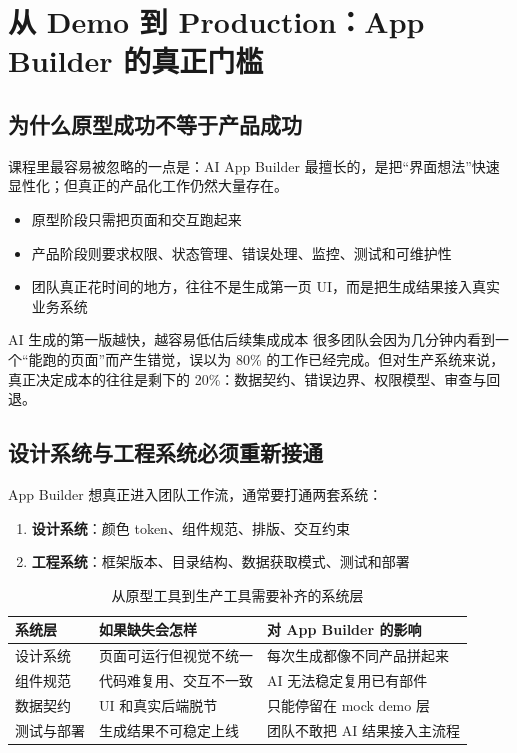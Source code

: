 \section{从 Demo 到 Production：App Builder 的真正门槛}

\subsection{为什么原型成功不等于产品成功}

课程里最容易被忽略的一点是：AI App Builder 最擅长的，是把“界面想法”快速显性化；但真正的产品化工作仍然大量存在。

\begin{itemize}
    \item 原型阶段只需把页面和交互跑起来
    \item 产品阶段则要求权限、状态管理、错误处理、监控、测试和可维护性
    \item 团队真正花时间的地方，往往不是生成第一页 UI，而是把生成结果接入真实业务系统
\end{itemize}

\begin{warningbox}{AI 生成的第一版越快，越容易低估后续集成成本}
很多团队会因为几分钟内看到一个“能跑的页面”而产生错觉，误以为 80\% 的工作已经完成。但对生产系统来说，真正决定成本的往往是剩下的 20\%：数据契约、错误边界、权限模型、审查与回退。
\end{warningbox}

\subsection{设计系统与工程系统必须重新接通}

App Builder 想真正进入团队工作流，通常要打通两套系统：

\begin{enumerate}
    \item \textbf{设计系统}：颜色 token、组件规范、排版、交互约束
    \item \textbf{工程系统}：框架版本、目录结构、数据获取模式、测试和部署
\end{enumerate}

\begin{table}[H]
\centering
\begin{tabular}{p{} p{} p{}}
\toprule
系统层 & 如果缺失会怎样 & 对 App Builder 的影响 \\
\midrule
设计系统 & 页面可运行但视觉不统一 & 每次生成都像不同产品拼起来 \\
组件规范 & 代码难复用、交互不一致 & AI 无法稳定复用已有部件 \\
数据契约 & UI 和真实后端脱节 & 只能停留在 mock demo 层 \\
测试与部署 & 生成结果不可稳定上线 & 团队不敢把 AI 结果接入主流程 \\
\bottomrule
\end{tabular}
\caption{从原型工具到生产工具需要补齐的系统层}
\end{table}

